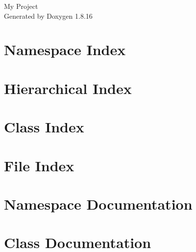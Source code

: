 \let\mypdfximage\pdfximage\def\pdfximage{\immediate\mypdfximage}\documentclass[twoside]{book}
\newcommand{\+}{\discretionary{\mbox{\scriptsize$\hookleftarrow$}}{}{}}
\newcommand{\clearemptydoublepage}{%
  \newpage{\pagestyle{empty}\cleardoublepage}%
}
\begin{document}
\hypersetup{pageanchor=false,
             bookmarksnumbered=true,
             pdfencoding=unicode
            }
\begin{titlepage}
\vspace*{7cm}
\begin{center}%
{\Large My Project }\\
\vspace*{1cm}
{\large Generated by Doxygen 1.8.16}\\
\end{center}
\end{titlepage}
\clearemptydoublepage
{}
\tableofcontents
\clearemptydoublepage
{}
\hypersetup{pageanchor=true}

\chapter{Namespace Index}

\chapter{Hierarchical Index}

\chapter{Class Index}

\chapter{File Index}

\chapter{Namespace Documentation}



\chapter{Class Documentation}

































\end{document}
